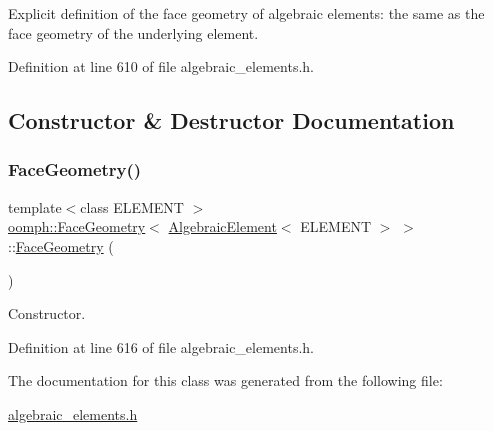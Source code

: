 Explicit definition of the face geometry of algebraic elements\+: the same as the face geometry of the underlying element. 

Definition at line 610 of file algebraic\+\_\+elements.\+h.



\subsection{Constructor \& Destructor Documentation}
\mbox{\label{classoomph_1_1FaceGeometry_3_01AlgebraicElement_3_01ELEMENT_01_4_01_4_af047e293c712c8366fb74f2081257cff}} 
\subsubsection{\texorpdfstring{Face\+Geometry()}{FaceGeometry()}}
{\footnotesize\ttfamily template$<$class E\+L\+E\+M\+E\+NT $>$ \\
\hyperlink{classoomph_1_1FaceGeometry}{oomph\+::\+Face\+Geometry}$<$ \hyperlink{classoomph_1_1AlgebraicElement}{Algebraic\+Element}$<$ E\+L\+E\+M\+E\+NT $>$ $>$\+::\hyperlink{classoomph_1_1FaceGeometry}{Face\+Geometry} (\begin{DoxyParamCaption}{ }\end{DoxyParamCaption})\hspace{0.3cm}{\ttfamily [inline]}}



Constructor. 



Definition at line 616 of file algebraic\+\_\+elements.\+h.



The documentation for this class was generated from the following file\+:\begin{DoxyCompactItemize}
\item 
\hyperlink{algebraic__elements_8h}{algebraic\+\_\+elements.\+h}\end{DoxyCompactItemize}

